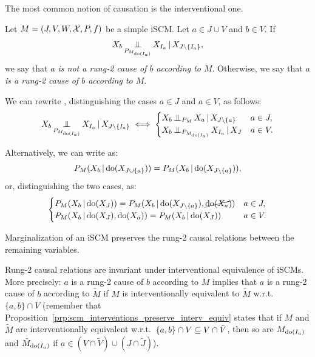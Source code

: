 The most common notion of causation is the interventional one.
\begin{Def}\label{def:scm_rung2_cause_of}
  Let $M = \left ( J, V, W, \mathcal{X}, P, f \right )$ be a simple iSCM.
  Let $a \in J \cup V$ and $b \in V$.
  If
    \begin{equation}\label{eq:scm_rung2_cause_of}
      X_b \operatorname*{\perp\mkern-11mu\perp}_{P_{M_{\operatorname{do}(I_a)}}} X_{I_a} \operatorname*{|} X_{J \setminus \{I_a\}},
    \end{equation}
  we say that \emph{$a$ is not a rung-2 cause of $b$ according to $M$}.
  Otherwise, we say that \emph{$a$ is a rung-2 cause of $b$ according to $M$}.
\end{Def}
\begin{Rem}\label{rem:scm_rung2_cause_of}
  We can rewrite , distinguishing the cases $a \in J$ and $a \in V$, as follows:
  $$X_b \operatorname*{\perp\mkern-11mu\perp}_{P_{M_{\operatorname{do}(I_a)}}} X_{I_a} \operatorname*{|} X_{J \setminus \{I_a\}} \iff \begin{cases}
    X_b \operatorname*{\perp\mkern-11mu\perp}_{P_{M}} X_a \operatorname*{|} X_{J \setminus \{a\}} & a \in J, \\
    X_b \operatorname*{\perp\mkern-11mu\perp}_{P_{M_{\operatorname{do}(I_a)}}} X_{I_a} \operatorname*{|} X_J & a \in V.
  \end{cases}$$

  Alternatively, we can write  as:
    $$P_{M}(X_b \operatorname*{|} \operatorname{do}(X_{J \cup \{a\}})) = P_{M}(X_b \operatorname*{|} \operatorname{do}(X_{J\setminus\{a\}})),$$
  or, distinguishing the two cases, as:
    $$\begin{cases}
      P_{M}(X_b \operatorname*{|} \operatorname{do}(X_J)) = P_{M}(X_b \operatorname*{|} \operatorname{do}(X_{J\setminus \{a\}}),\cancel{\operatorname{do}(X_a)}) & a \in J, \\
      P_{M}(X_b \operatorname*{|} \operatorname{do}(X_J), \operatorname{do}(X_a)) = P_{M}(X_b \operatorname*{|} \operatorname{do}(X_J)) & a \in V.
    \end{cases}$$
\end{Rem}

\begin{Rem}\label{rem:scm_rung2_cause_of_marginalization}
  Marginalization of an iSCM preserves the rung-2 causal relations between the remaining variables.
\end{Rem}
\begin{Rem}\label{rem:scm_rung2_cause_of_interventional_equivalence}
  Rung-2 causal relations are invariant under interventional equivalence of iSCMs.
  More precisely: $a$ is a rung-2 cause of $b$ according to $M$ implies that $a$ is a rung-2 cause of $b$ according to $\tilde{M}$ if $M$ is interventionally equivalent to $\tilde{M}$ w.r.t.\ $\{a,b\} \cap V$
  (remember that Proposition~\ref{prp:scm_interventions_preserve_interv_equiv} states that if $M$ and $\tilde{M}$ are interventionally equivalent w.r.t.\ $\{a,b\} \cap V \subseteq V \cap \tilde{V}$, then so are $M_{\operatorname{do}(I_a)}$ and $\tilde{M}_{\operatorname{do}(I_a)}$ if $a \in (V \cap \tilde{V}) \cup (J \cap \tilde{J})$).
\end{Rem}

